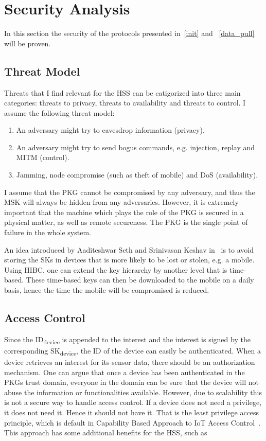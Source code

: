 \section{Security Analysis}
In this section the security of the protocols presented in~\autoref{init} and ~\autoref{data_pull} will be proven.

\subsection{Threat Model}
Threats that I find relevant for the \gls{HSS} can be catigorized into three main categories: threats to privacy, threats to availability and threats to control.
I assume the following threat model:
\begin{enumerate}
  \item An adversary might try to eavesdrop information (privacy).
  \item An adversary might try to send bogus commands, e.g. injection, replay and \gls{MITM} (control).
  \item Jamming, node compromise (such as theft of mobile) and \gls{DoS} (availability).
\end{enumerate}

I assume that the \gls{PKG} cannot be compromised by any adversary, and thus the \gls{MSK} will always be hidden from any adversaries. 
However, it is extremely important that the machine which plays the role of the \gls{PKG} is secured in a physical matter, as well as remote secureness. 
The \gls{PKG} is the single point of failure in the whole system.

An idea introduced by Aaditeshwar Seth and Srinivasan Keshav in~\cite[Section 5.4]{Seth:2005:PSD:1897159.1897165} is to avoid storing the \gls{SK}s in devices that is more likely to be lost or stolen, e.g. a mobile.
Using \gls{HIBC}, one can extend the key hierarchy by another level that is time-based.
These time-based keys can then be downloaded to the mobile on a daily basis, hence the time the mobile will be compromised is reduced.

\subsection{Access Control}\label{access_control}
Since the ID\textsubscript{device} is appended to the \gls{interest} and the \gls{interest} is signed by the corresponding SK\textsubscript{device}, the \gls{ID} of the device can easily be authenticated. 
When a device retrieves an \gls{interest} for its sensor \gls{data}, there should be an authorization mechanism. 
One can argue that once a device has been authenticated in the \gls{PKG}s trust domain, everyone in the domain can be sure that the device will not abuse the information or functionalities available. 
However, due to scalability this is not a secure way to handle access control. 
If a device does not need a privilege, it does not need it.
Hence it should not have it. 
That is the least privilege access principle, which is default in Capability Based Approach to \gls{IoT} Access Control~\cite{DBLP:conf/imis/GusmeroliPR12}.
This approach has some additional benefits for the \gls{HSS}, such as

